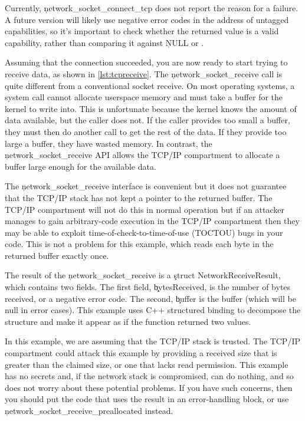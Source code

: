 \begin{note}
Currently, \c{network_socket_connect_tcp} does not report the reason for a failure.
A future version will likely use negative error codes in the address of untagged capabilities, so it's important to check whether the returned value is a valid capability, rather than comparing it against \c{NULL} or .
\end{note}

Assuming that the connection succeeded, you are now ready to start trying to receive data, as shown in \ref{lst:tcpreceive}.
The \c{network_socket_receive} call is quite different from a conventional socket receive.
On most operating systems, a system call cannot allocate userspace memory and must take a buffer for the kernel to write into.
This is unfortunate because the kernel knows the amount of data available, but the caller does not.
If the caller provides too small a buffer, they must then do another call to get the rest of the data.
If they provide too large a buffer, they have wasted memory.
In contrast, the \c{network_socket_receive} API allows the TCP/IP compartment to allocate a buffer large enough for the available data.

\codelisting[filename=examples/tcp/tcp.cc,marker=receive,label=lst:tcpreceive,caption="Receiving data from a remote server."]{}

\begin{caution}
The \c{network_socket_receive} interface is convenient but it does not guarantee that the TCP/IP stack has not kept a pointer to the returned buffer.
The TCP/IP compartment will not do this in normal operation but if an attacker manages to gain arbitrary-code execution in the TCP/IP compartment then they may be able to exploit time-of-check-to-time-of-use (TOCTOU) bugs in your code.
This is not a problem for this example, which reads each byte in the returned buffer exactly once.
\end{caution}

The result of the \c{network_socket_receive} is a \c{struct NetworkReceiveResult}, which contains two fields.
The first field, \c{bytesReceived}, is the number of bytes received, or a negative error code.
The second, \c{buffer} is the buffer (which will be null in error cases).
This example uses C++ structured binding to decompose the structure and make it appear as if the function returned two values.

In this example, we are assuming that the TCP/IP stack is trusted.
The TCP/IP compartment could attack this example by providing a received size that is greater than the claimed size, or one that lacks read permission.
This example has no secrets and, if the network stack is compromised, can do nothing, and so does not worry about these potential problems.
If you have such concerns, then you should put the code that uses the result in an error-handling block, or use \c{network_socket_receive_preallocated} instead.

